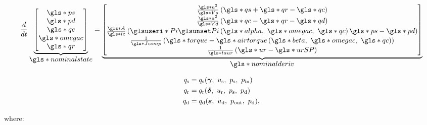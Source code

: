 \begin{equation}
    \dt{} \ubrace{\begin{bmatrix}
      \g{ps}\\
      \g{pd}\\
      \g{qc}\\
      \g{omegac}\\
      \g{qr}
    \end{bmatrix}}{\g{nominalstate}} =
    \ubrace{\begin{bmatrix}
      \frac{\g{a}^2}{\g{Vs}}\left(\g{qs}+\g{qr}-\g{qc}\right)\\
      \frac{\g{a}^2}{\g{Vd}}\left(\g{qc}-\g{qr}-\g{qd}\right)\\
      \frac{\g{A}}{\g{lc}}\left(\gi{Pi}\left(\g{alpha},\ \g{omegac},\ \g{qc} \right)\g{ps} - \g{pd}  \right)\\
      \frac{1}{\g{Jcomp}}\left(\g{torque} - \g{airtorque}\left(\g{beta},\ \g{omegac},\ \g{qc}\right)\right)\\
      \frac{1}{\g{taur}}\left(\g{ur} - \g{urSP} \right)
    \end{bmatrix}}{\g{nominalderiv}}
  \label{eq:mod:single_comp_states}
\end{equation}

\begin{equation}
  \begin{split}
    q_\text{s} & = q_\text{s}(\vc{\gamma},\ u_{\text{s}},\ p_\text{s},\ p_{\text{in}})\\
    q_\text{r} & = q_\text{r}(\vc{\delta},\ u_\text{r},\ p_\text{s},\ p_\text{d})\\
    q_\text{d} & = q_\text{d}(\vc{\varepsilon},\ u_{\text{d}},\ p_{\text{out}},\ p_\text{d}),
  \end{split}
\end{equation}

\noindent where:

